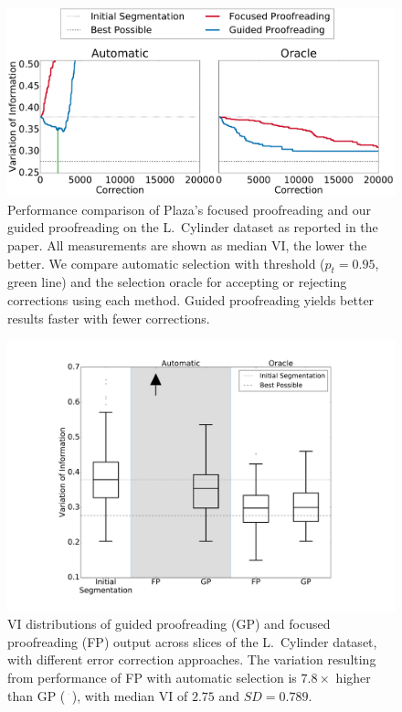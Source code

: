 \begin{figure}[t]
\centering
\includegraphics[width=\linewidth]{gfx/cyl_trails.pdf}
\caption{Performance comparison of Plaza's focused proofreading and our guided proofreading on the L.~Cylinder dataset as reported in the paper. All measurements are shown as median VI, the lower the better. We compare automatic selection with threshold ($p_t=0.95$, green line) and the selection oracle for accepting or rejecting corrections using each method. Guided proofreading yields better results faster with fewer corrections.}
\label{fig:cyltrails}
\end{figure}

\begin{figure}[t]
\centering
\includegraphics[width=\linewidth]{gfx/cylboxplot.pdf}
\caption{VI distributions of guided proofreading (GP) and focused proofreading (FP) output across slices of the L.~Cylinder dataset, with different error correction approaches. The variation resulting from performance of FP with automatic selection is $7.8\times$ higher than GP (\protect\includegraphics[width=0.2cm]{gfx/arrow.pdf}), with median VI of $2.75$ and $SD=0.789$.}
\label{fig:cylboxplot}
\end{figure}

